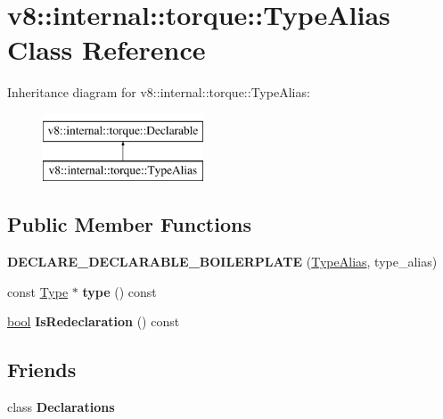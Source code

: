 \hypertarget{classv8_1_1internal_1_1torque_1_1TypeAlias}{}\section{v8\+:\+:internal\+:\+:torque\+:\+:Type\+Alias Class Reference}
\label{classv8_1_1internal_1_1torque_1_1TypeAlias}
Inheritance diagram for v8\+:\+:internal\+:\+:torque\+:\+:Type\+Alias\+:\begin{figure}[H]
\begin{center}
\leavevmode
\includegraphics[height=2.000000cm]{classv8_1_1internal_1_1torque_1_1TypeAlias}
\end{center}
\end{figure}
\subsection*{Public Member Functions}
\begin{DoxyCompactItemize}
\item 
\mbox{\label{classv8_1_1internal_1_1torque_1_1TypeAlias_aec0e1a6d2cdcb552d42755529dbc8740}} 
{\bfseries D\+E\+C\+L\+A\+R\+E\+\_\+\+D\+E\+C\+L\+A\+R\+A\+B\+L\+E\+\_\+\+B\+O\+I\+L\+E\+R\+P\+L\+A\+TE} (\mbox{\hyperlink{classv8_1_1internal_1_1torque_1_1TypeAlias}{Type\+Alias}}, type\+\_\+alias)
\item 
\mbox{\label{classv8_1_1internal_1_1torque_1_1TypeAlias_ab59fa7bc94497b775dc09bef376a2777}} 
const \mbox{\hyperlink{classv8_1_1internal_1_1torque_1_1Type}{Type}} $\ast$ {\bfseries type} () const
\item 
\mbox{\label{classv8_1_1internal_1_1torque_1_1TypeAlias_a4c6f0c36d0bf3633826d3d8d2a047d81}} 
\mbox{\hyperlink{classbool}{bool}} {\bfseries Is\+Redeclaration} () const
\end{DoxyCompactItemize}
\subsection*{Friends}
\begin{DoxyCompactItemize}
\item 
\mbox{\label{classv8_1_1internal_1_1torque_1_1TypeAlias_a23135931a5f054329315374b774718cf}} 
class {\bfseries Declarations}
\end{DoxyCompactItemize}
